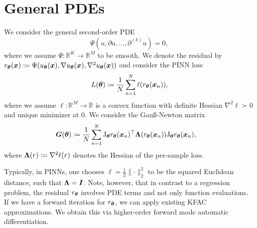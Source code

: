 

\section{General PDEs}
We consider the general second-order PDE 
\begin{equation}
    \Psi(u, \partial u, \dots, \partial^{(k)} u) = 0,
\end{equation}
where we assume $\Psi\colon \mathbb R^{K}\to\mathbb R^M$ to be smooth.
We denote the residual by $r_\vtheta(\vx)\coloneqq \Psi(u_\vtheta(\vx), \nabla u_\vtheta(\vx), \nabla^{2} u_\vtheta(\vx))%
$ %
and consider the PINN loss 
\begin{equation}
    L({\bm{\theta}})\coloneqq \frac1N\sum_{n=1}^N \ell(r_{{\bm{\theta}}}({\bm{x}}_n)),
\end{equation}
where we assume $\ell\colon\mathbb R^M\to\mathbb R$ is a convex function with definite Hessian $\nabla^2\ell\succ0$ and unique minimizer at $0$. 
We consider the Gauß-Newton matrix
\begin{align}
    {\bm{G}}({\bm{\theta}}) & \coloneqq \frac1N\sum_{n=1}^N \mathrm{J}_{\bm{\theta}} r_{\bm{\theta}}({\bm{x}}_n)^\top {\bm{\Lambda}}(r_{\bm{\theta}}({\bm{x}}_n)) \mathrm{J}_{\bm{\theta}} r_{\bm{\theta}}({\bm{x}}_n), 
\end{align}
where ${\bm{\Lambda}}(r)\coloneqq \nabla^2 \ell(r)$ denotes the Hessian of the per-sample loss. %

Typically, in PINNs, one chooses $\ell = \frac12\lVert \cdot \rVert_2^2$ to be the squared Euclidean distance, such that ${\bm{\Lambda}} = {\bm{I}}$. 
Note, however, that in contrast to a regression problem, the residual $r_{\bm{\theta}}$ involves PDE terms and not only function evaluations. 
If we have a forward iteration for $r_{\bm{\theta}}$, we can apply existing KFAC approximations. 
We obtain this via higher-order forward mode automatic differentiation. 

